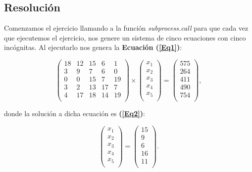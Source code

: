 \documentclass[12pt,twoside]{article}
\begin{document}
\subsection{Resolución}

Comenzamos el ejercicio llamando a la función \textit{subprocess.call} para que cada vez que ejecutemos el ejercicio, nos genere un sistema de cinco ecuaciones con cinco incógnitas.
Al ejecutarlo nos genera la \textbf{Ecuación (\ref{Eq1})}:

\begin{equation}
		\left(
			\begin{array}{ccccc}
				18  & 12 & 15 & 6 & 1 \\
				3 & 9  & 7 & 6 & 0 \\
				0  & 0 & 15 & 7  & 19 \\
				3  & 2  & 13  & 17 & 7 \\
				4 & 17 & 18  & 14  & 19 \\
			\end{array}
		\right)
		\times
		\left(
			\begin{array}{c}
				x_1 \\
				x_2 \\
				x_3 \\
				x_4 \\
				x_5 \\
			\end{array}
		\right)
		=
		\left(
			\begin{array}{c}
				575 \\
				264 \\
				411 \\
				490 \\
				754 \\
			\end{array}
		\right),
\label{Eq1}
	\end{equation}

donde la solución a dicha ecuación es \textbf{(\ref{Eq2})}:

\begin{equation}
	\left(
		\begin{array}{c}
			x_1 \\
			x_2 \\
			x_3 \\
			x_4 \\
			x_5 \\
		\end{array}
	\right)
	=
	\left(
		\begin{array}{c}
			15 \\
			9 \\
			6 \\
			16 \\
			11 \\
		\end{array}
	\right).
	\label{Eq2}
\end{equation}
\end{document}
